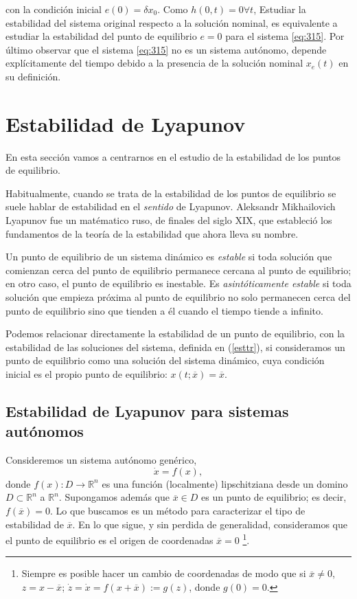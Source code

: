 con la condición inicial $e(0) = \delta x_0$. Como $h(0,t) = 0 \forall t$, Estudiar la estabilidad del sistema original respecto a la solución nominal, es equivalente a estudiar la estabilidad del punto de equilibrio $e=0$ para el sistema  \ref{eq:315}. Por último observar que el sistema \ref{eq:315} no es un sistema autónomo, depende explícitamente del tiempo debido a la presencia de la solución nominal $x_e(t)$ en su definición.

\section{Estabilidad de Lyapunov}
 En esta sección vamos a centrarnos en el estudio de la estabilidad de los puntos de equilibrio. 

Habitualmente, cuando se trata de la estabilidad de los puntos de equilibrio se suele hablar de estabilidad en el \emph{sentido} de Lyapunov. Aleksandr Mikhailovich Lyapunov fue un matématico ruso, de finales del siglo XIX, que estableció los fundamentos de la teoría de la estabilidad que ahora lleva su nombre.

Un punto de equilibrio de un sistema dinámico es \emph{estable} si toda  solución que comienzan cerca del punto de equilibrio permanece cercana al punto de equilibrio; en otro caso, el punto de equilibrio es inestable. Es \emph{asintóticamente estable} si toda solución que empieza próxima al punto de equilibrio no solo permanecen cerca del punto de equilibrio sino que tienden a él cuando el tiempo tiende a infinito.

Podemos relacionar directamente la estabilidad de un punto de equilibrio, con la estabilidad de las soluciones del sistema,  definida en (\ref{esttr}), si consideramos  un punto de equilibrio como una solución del sistema dinámico, cuya condición inicial es el propio punto de equilibrio: $x(t;\overline x) = \overline x$.

\subsection{Estabilidad de Lyapunov para sistemas autónomos}
Consideremos un sistema autónomo genérico,
\begin{equation}\label{eq: aut}
\dot x = f(x),
\end{equation}
donde $f(x): D\rightarrow \mathbb{R}^n$ es una función (localmente) lipschitziana desde un domino $D \subset \mathbb{R}^n$ a $\mathbb{R}^n$. Supongamos además que $\overline x \in D$ es un punto de equilibrio; es decir, $f(\overline x) = 0$. Lo que buscamos es un método para caracterizar el tipo de estabilidad de $\overline x$. En lo que sigue, y sin perdida de generalidad, consideramos que el punto de equilibrio es el origen de coordenadas $\overline x = 0$ \footnote{Siempre es posible hacer un cambio de coordenadas de modo que si $\overline x \neq 0$, $z = x-\overline x$; $\dot z = \dot x = f(x+\overline x) := g(z)$, donde $g(0)=0$.}.

